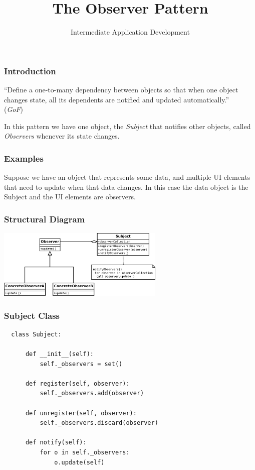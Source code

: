 \documentclass[10pt]{beamer}
\title{The Observer Pattern}
\author[IN608]{Intermediate Application Development}
\institute[Otago Polytechnic]{
  Otago Polytechnic \\
  Dunedin, New Zealand \\
  Kaiako: Tom Clark
}
\date{}
\begin{document}
\begin{frame}[plain]
  \titlepage
\end{frame}

\begin{frame}[fragile]
  \frametitle{Introduction}
  
  \vspace{5mm}
   ``Define a one-to-many dependency between objects so that when one object changes state,
   all its dependents are notified and updated automatically.'' \\
  (\emph{GoF})
  
  In this pattern we have one object, the \emph{Subject} that notifies other objects, 
  called \emph{Observers} whenever its state changes.
  
  \end{frame}

\begin{frame}
  \frametitle{Examples}
  
  Suppose we have an object that represents some data, and multiple UI elements that need to update 
  when that data changes. In this case the data object is the Subject and the UI elements are observers.
  
    
\end{frame}



\begin{frame}
  \frametitle{Structural Diagram} 
  \includegraphics[width=8cm]{observer.png}
  \end{frame}
  

 
\begin{frame}[fragile]
  \frametitle{Subject Class}

  \begin{verbatim}
  class Subject:
  
      def __init__(self):
          self._observers = set()
          
      def register(self, observer):
          self._observers.add(observer)
          
      def unregister(self, observer):
          self._observers.discard(observer)
          
      def notify(self):
          for o in self._observers:
              o.update(self)         
  \end{verbatim}
 \end{frame} 
\end{document}
